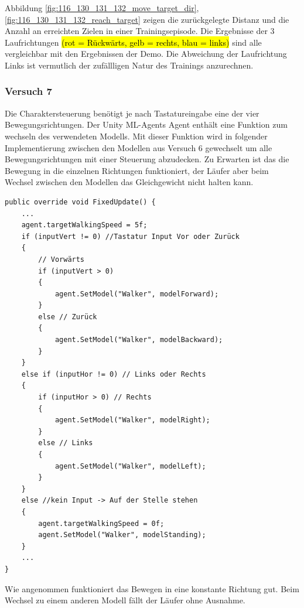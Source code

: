 Abbildung \ref{fig:116_130_131_132_move_target_dir}, \ref{fig:116_130_131_132_reach_target} zeigen die zurückgelegte Distanz und die Anzahl an erreichten Zielen in einer Trainingsepisode. Die Ergebnisse der 3 Laufrichtungen \hl{(rot = Rückwärts, gelb = rechts, blau = links)} sind alle vergleichbar mit den Ergebnissen der Demo. Die Abweichung der Laufrichtung Links ist vermutlich der zufällligen Natur des Trainings anzurechnen.

\subsubsection{Versuch 7}
Die Charaktersteuerung benötigt je nach Tastatureingabe eine der vier Bewegungsrichtungen. Der Unity ML-Agents Agent enthält eine Funktion zum wechseln des verwendeten Modells. Mit dieser Funktion wird in folgender Implementierung zwischen den Modellen aus Versuch 6 gewechselt um alle Bewegungsrichtungen mit einer Steuerung abzudecken. Zu Erwarten ist das die Bewegung in die einzelnen Richtungen funktioniert, der Läufer aber beim Wechsel zwischen den Modellen das Gleichgewicht nicht halten kann.

\begin{lstlisting}[caption={Laufrichtung Modell wechseln},captionpos=b,label={lst:laufrichtung_modell_wechsel}]
public override void FixedUpdate() {
    ...    
    agent.targetWalkingSpeed = 5f;
    if (inputVert != 0) //Tastatur Input Vor oder Zurück
    {
        // Vorwärts
        if (inputVert > 0)
        {
            agent.SetModel("Walker", modelForward);
        }
        else // Zurück
        {
            agent.SetModel("Walker", modelBackward);
        }
    }
    else if (inputHor != 0) // Links oder Rechts
    {
        if (inputHor > 0) // Rechts
        {
            agent.SetModel("Walker", modelRight);
        }
        else // Links
        {
            agent.SetModel("Walker", modelLeft);
        }
    }
    else //kein Input -> Auf der Stelle stehen
    {
        agent.targetWalkingSpeed = 0f;
        agent.SetModel("Walker", modelStanding);
    }
    ...
}
\end{lstlisting}

Wie angenommen funktioniert das Bewegen in eine konstante Richtung gut. Beim Wechsel zu einem anderen Modell fällt der Läufer ohne Ausnahme.

